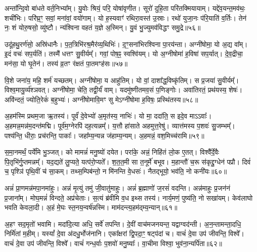 अन्ता᳚न्दि॒वो बा॑धते वर्त॒निभ्या᳚म्।
यु॒वोः श्रियं॒ परि॒ योषा॑वृणीत।
सूरो॑ दुहि॒ता परि॑तक्मियायाम्।
यद्दे॑व॒यन्त॒मव॑थः॒ शची॑भिः।
परि॑घ्र॒ꣳ॒ सवां॒ मना॑वां॒ वयो॑गाम्।
यो ह॒स्यवाꣳ॑ रथिरा॒वस्त॑ उ॒स्राः।
रथो॑ युजा॒नः प॑रि॒याति॑ व॒र्तिः।
तेन॑ नः॒ शं योरु॒षसो॒ व्यु॑ष्टौ।
न्य॑श्विना वहतं य॒ज्ञे अ॒स्मिन्।
यु॒वं भु॒ज्युमव॑विद्धꣳ समु॒द्रे॥५६॥\ip

उदू॑हथु॒रर्ण॑सो॒ अस्रि॑धानैः।
प॒त॒त्रिभि॑रश्र॒मैर॑व्य॒थिभिः॑।
द॒ꣳ॒सना॑भिरश्विना पा॒रय॑न्ता।
अग्नी॑षोमा॒ यो अ॒द्य वा᳚म्।
इ॒दं वचः॑ सप॒र्यति॑।
तस्मै॑ धत्तꣳ सु॒वीर्यम्᳚।
गवां॒ पोष॒ꣴ॒ स्वश्वि॑यम्।
यो अ॒ग्नीषोमा॑ ह॒विषा॑ सप॒र्यात्।
दे॒व॒द्रीचा॒ मन॑सा॒ यो घृ॒तेन॑।
तस्य॑ व्र॒तꣳ र॑क्षतं पा॒तमꣳह॑सः॥५७॥\ip

वि॒शे जना॑य॒ महि॒ शर्म॑ यच्छतम्।
अग्नी॑षोमा॒ य आहु॑तिम्।
यो वां॒ दाशा᳚द्ध॒विष्कृ॑तिम्।
स प्र॒जया॑ सु॒वीर्यम्᳚।
विश्व॒मायु॒र्व्य॑श्ञवत्।
अग्नी॑षोमा॒ चेति॒ तद्वी॒र्यं॑ वाम्।
यदमु॑ष्णीतमव॒सं प॒णिङ्गोः।
अवा॑तिरतं॒ प्रथ॑यस्य॒ शेषः॑।
अवि॑न्दतं॒ ज्योति॒रेकं॑ ब॒हुभ्यः॑।
अग्नी॑षोमावि॒मꣳ सु मेऽग्नी॑षोमा ह॒विषः॒ प्रस्थि॑तस्य॥५८॥\ip\anuvakamend[ज॒भा॒र॒ द्यौर॒ग्नेरु॒पस्थ॑ उप॒क्ष्यन्तो॑ बद्बधा॒नो व॒ध्वा॑ याद॑मानः समु॒द्रे\-ऽꣳह॑सः॒ प्रस्थि॑तस्य]

अ॒हम॑स्मि प्रथम॒जा ऋ॒तस्य॑।
पूर्वं॑ दे॒वेभ्यो॑ अ॒मृत॑स्य॒ नाभिः॑।
यो मा॒ ददा॑ति॒ स इदे॒व माऽऽवाः᳚।
अ॒हमन्न॒मन्न॑\-म॒दन्त॑\-मद्मि।
पूर्व॑म॒ग्नेरपि॑ दह॒त्यन्नम्᳚।
य॒त्तौ हा॑साते अहमुत्त॒रेषु॑।
व्यात्त॑मस्य प॒शवः॑ सु॒जम्भम्᳚।
पश्य॑न्ति॒ धीराः॒ प्रच॑रन्ति॒ पाकाः᳚।
जहा᳚म्य॒न्यन्न ज॑हाम्य॒न्यम्।
अ॒हमन्नं॒ वश॒मिच्च॑रामि॥५९॥\ip

स॒मा॒नमर्थं॒ पर्ये॑मि भु॒ञ्जत्।
को मामन्नं॑ मनु॒ष्यो॑ दयेत।
परा॑के॒ अन्नं॒ निहि॑तं लो॒क ए॒तत्।
विश्वै᳚र्दे॒वैः पि॒तृभि॑र्गु॒प्तमन्नम्᳚।
यद॒द्यते॑ लु॒प्यते॒ यत्प॑रो॒प्यते᳚।
श॒त॒त॒मी सा त॒नूर्मे॑ बभूव।
म॒हान्तौ॑ च॒रू स॑कृद्दु॒ग्धेन॑ पप्रौ।
दिवं॑ च॒ पृश्ञि॑ पृथि॒वीं च॑ सा॒कम्।
तथ्स॒म्पिब॑न्तो॒ न मि॑नन्ति वे॒धसः॑।
नैतद्भूयो॒ भव॑ति॒ नो कनी॑यः॥६०॥\ip

अन्नं॑ प्रा॒णमन्न॑मपा॒नमा॑हुः।
अन्नं॑ मृ॒त्युं तमु॑ जी॒वातु॑माहुः।
अन्नं॑ ब्र॒ह्माणो॑ ज॒रसं॑  वदन्ति।
अन्न॑माहुः प्र॒जन॑नं प्र॒जाना᳚म्।
मोघ॒मन्नं॑ विन्दते॒ अप्र॑चेताः।
स॒त्यं ब्र॑वीमि व॒ध इथ्स तस्य॑।
नार्य॒मणं॒ पुष्य॑ति॒ नो सखा॑यम्।
केव॑लाघो भवति केवला॒दी।
अ॒हं मे॒घः स्त॒नय॒न्वर्\mbox{}ष॑न्नस्मि।
माम॑दन्त्य॒हम॑द्म्य॒न्यान्॥६१॥\ip

अ॒हꣳ सद॒मृतो॑ भवामि।
मदा॑दि॒त्या अधि॒ सर्वे॑ तपन्ति।
दे॒वीं वाच॑मजनयन्त॒ यद्वाग्वद॑न्ती।
अ॒न॒न्तामन्ता॒दधि॒ निर्मि॑तां म॒हीम्।
यस्यां᳚ दे॒वा अ॑दधु॒र्भोज॑नानि।
एका᳚क्षरां द्वि॒पदा॒ꣳ॒ षट्प॑दां च।
वाचं॑ दे॒वा उप॑ जीवन्ति॒ विश्वे᳚।
वाचं॑ दे॒वा उप॑ जीवन्ति॒ विश्वे᳚।
वाचं॑ गन्ध॒र्वाः प॒शवो॑ मनु॒ष्याः᳚।
वा॒चीमा विश्वा॒ भुव॑ना॒न्यर्पि॑ता॥६२॥\ip

